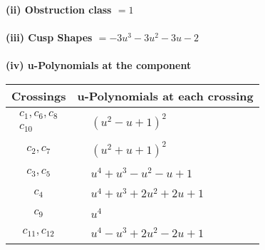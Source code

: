 \documentclass[1p]{elsarticle_modified}
\theoremstyle{definition}
\begin{document}
\flushleft \textbf{(ii) Obstruction class $= 1$}\\~\\
\flushleft \textbf{(iii) Cusp Shapes $= -3 u^3-3 u^2-3 u-2$}\\~\\
\newpage\renewcommand{\arraystretch}{1}
\flushleft \textbf{(iv) u-Polynomials at the component}\newline \\
\begin{tabular}{m{50pt}|m{274pt}}
Crossings & \hspace{64pt}u-Polynomials at each crossing \\
\hline $$\begin{aligned}c_{1},c_{6},c_{8}\\c_{10}\end{aligned}$$&$\begin{aligned}
&(u^2- u+1)^2
\end{aligned}$\\
\hline $$\begin{aligned}c_{2},c_{7}\end{aligned}$$&$\begin{aligned}
&(u^2+u+1)^2
\end{aligned}$\\
\hline $$\begin{aligned}c_{3},c_{5}\end{aligned}$$&$\begin{aligned}
&u^4+u^3- u^2- u+1
\end{aligned}$\\
\hline $$\begin{aligned}c_{4}\end{aligned}$$&$\begin{aligned}
&u^4+u^3+2 u^2+2 u+1
\end{aligned}$\\
\hline $$\begin{aligned}c_{9}\end{aligned}$$&$\begin{aligned}
&u^4
\end{aligned}$\\
\hline $$\begin{aligned}c_{11},c_{12}\end{aligned}$$&$\begin{aligned}
&u^4- u^3+2 u^2-2 u+1
\end{aligned}$\\
\hline
\end{tabular}\\~\\
\end{document}
